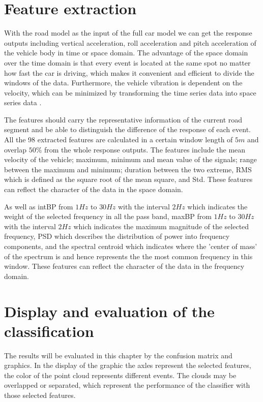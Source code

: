  
 \section{Feature extraction}
 \label{sec:feature_ex}

 With the road model as the input of the full car model we can get the response outputs including vertical acceleration, roll acceleration and pitch acceleration of the vehicle body in time or space domain. 
 The advantage of the space domain over the time domain is that every event is located at the same spot no matter how fast the car is driving, which makes it convenient and efficient to divide the windows of the data.
 Furthermore, the vehicle vibration is dependent on the velocity, which can be minimized by transforming the time series data into space series data \cite{ward_speed-independent_2009}.

 The features should carry the representative information of the current road segment and be able to distinguish the difference of the response of each event.
 All the 98 extracted features are calculated in a certain window length of $5m$ and overlap $50\%$ from the whole response outputs. 
 The features include the mean velocity of the vehicle; maximum, minimum and mean value of the signals; range between the maximum and minimum; duration between the two extreme, \ac{RMS} which is defined as the square root of the mean square, and \ac{Std}.
 These features can reflect the character of the data in the space domain.
 
 As well as \ac{intBP} from $1Hz$ to $30Hz$ with the interval $2Hz$ which indicates the weight of the selected frequency in all the pass band, \ac{maxBP} from $1Hz$ to $30Hz$ with the interval $2Hz$ which indicates the maximum magnitude of the selected frequency, \ac{PSD} which describes the distribution of power into frequency components, and the spectral centroid which indicates where the ’center of mass’ of the spectrum is and hence represents the the most common frequency in this window.
 These features can reflect the character of the data in the frequency domain.
 


\section{Display and evaluation of the classification}
\label{sec:evaluation}
 
The results will be evaluated in this chapter by the confusion matrix and graphics.
%
In the display of the graphic the axles represent the selected features, the color of the point cloud represents different events.
%
The clouds may be overlapped or separated, which represent the performance of the classifier with those selected features.


